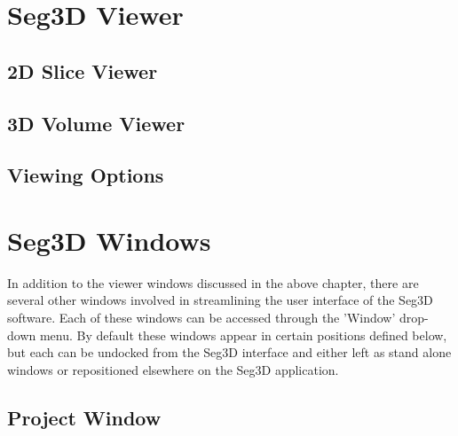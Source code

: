 \documentclass[fleqn,11pt,openany]{book}
\begin{document}
\chapter{Seg3D Viewer}

\begin{introduction}

\end{introduction}

\section{2D Slice Viewer}

\section{3D Volume Viewer}

\section{Viewing Options}

\chapter{Seg3D Windows}

\begin{introduction}
In addition to the viewer windows discussed in the above chapter, there are several other
 windows involved in streamlining the user interface of the Seg3D software.  
 Each of these windows can be accessed through the 'Window' drop-down menu.
 By default these windows appear in certain positions defined below, but each can be undocked
 from the Seg3D interface and either left as stand alone windows or repositioned elsewhere on
 the Seg3D application.
  
\end{introduction}

\section{Project Window}
\end{document}
